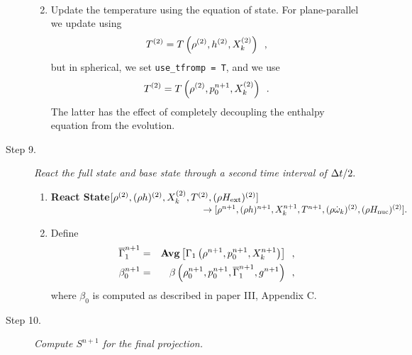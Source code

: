 \begin{description}
\begin{enumerate}
\begin{eqnarray}
\end{eqnarray}
\item Update the temperature using the equation of state.  For plane-parallel we
update using
\begin{equation}
T^{(2)} = T\left(\rho^{(2)}, h^{(2)}, X_k^{(2)}\right) \enskip ,
\end{equation}
but in spherical, we set {\tt use\_tfromp = T}, and we use
\begin{equation}
T^{(2)} = T\left(\rho^{(2)}, p_0^{n+1}, X_k^{(2)}\right) \enskip .
\end{equation}
The latter has the effect of completely decoupling the enthalpy equation from the 
evolution.

\end{enumerate}

\item[Step 9.] {\em React the full state and base state through a second time 
interval of $\Delta t / 2.$}

\begin{enumerate}
\renewcommand{\theenumi}{{\bf \alph{enumi}}}

\item {\bf React State}$[\rho^{(2)},(\rho h)^{(2)}, X_k^{(2)},T^{(2)}, (\rho{H_{\rm ext}})^{(2)} ]$\\
$~~~~~~~~~~~~~~~~~~~~~~~~~~~~~~~~~~~~~~~~~~~~~~~~~~\rightarrow [\rho^{n+1}, 
(\rho h)^{n+1}, X_k^{n+1}, T^{n+1}, (\rho \dot{\omega}_k)^{(2)}, (\rho {H_{\rm nuc}})^{(2)} ].$  

\item Define
\begin{eqnarray}
 \overline{\Gamma}_1^{n+1}    &=& {\rm{\bf Avg}}\left[\Gamma_1\left(\rho^{n+1}, p_0^{n+1}, X_k^{n+1}\right) \right] \enskip , \\ 
 \beta_0^{n+1}    &=& \beta   \left(\rho_0^{n+1}, p_0^{n+1}, \overline{\Gamma}_1^{n+1}, g^{n+1}\right) \enskip ,
\end{eqnarray}
where $\beta_0$ is computed as described in paper III, Appendix C.

\end{enumerate}

\item[Step 10.] {\em Compute $S^{n+1}$ for the final projection.}


\end{description}
